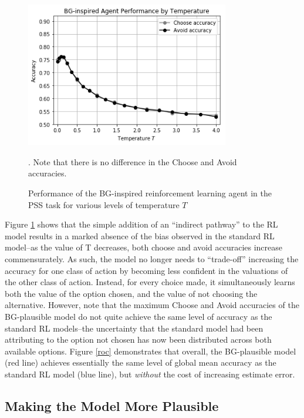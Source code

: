\documentclass[10pt,letterpaper]{article}
\begin{document}
\begin{figure}[ht]
	\begin{center}
		\includegraphics[width=3.5in]{bg-agent-performance.png}
	\end{center}
	\caption{Performance of the BG-inspired reinforcement learning agent in the PSS task for various levels of temperature $T$}. Note that there is no difference in the Choose and Avoid accuracies.
	\label{bg-agents}
\end{figure}

Figure \ref{bg-agents} shows that the simple addition of an ``indirect pathway'' to the RL model results in a marked absence of the bias observed in the standard RL model--as the value of T decreases, both choose and avoid accuracies increase commensurately. As such, the model no longer needs to ``trade-off'' increasing the accuracy for one class of action by becoming less confident in the valuations of the other class of action. Instead, for every choice made, it simultaneously learns both the value of the option chosen, and the value of not choosing the alternative. However, note that the maximum Choose and Avoid accuracies of the BG-plausible model do not quite achieve the same level of accuracy as the standard RL models--the uncertainty that the standard model had been attributing to the option not chosen has now been distributed across both available options.  Figure \ref{roc} demonstrates that overall, the BG-plausible model (red line) achieves essentially the same level of global mean accuracy as the standard RL model (blue line), but \emph{without} the cost of increasing estimate error.  


\subsection{Making the Model More Plausible}
\end{document}

